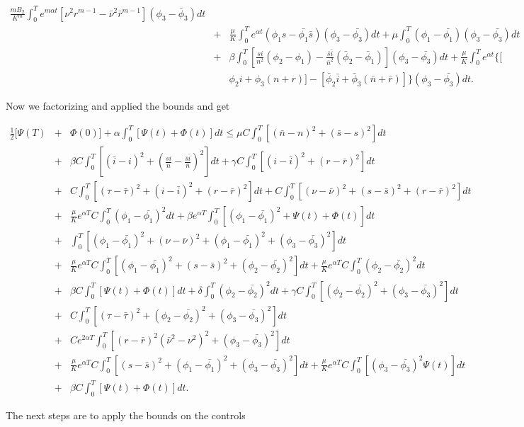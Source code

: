 \begin{eqnarray*}
\frac{m B_2}{K^m}\int_{0}^{T}e^{m\alpha 
t}[\nu^2r^{m-1}-\bar{\nu}^2\bar{r}^{m-1}](\phi_3-\bar{\phi}_3)dt\\
&+&\frac{\mu}{K}\int_{0}^{T}e^{\alpha t}(\phi_1 
s-\bar{\phi_1}\bar{s})(\phi_3-\bar{\phi_3})dt 
+\mu\int_{0}^{T}(\phi_1-\bar{\phi_1})(\phi_3-\bar{\phi_3})dt\nonumber\\
&+&\beta\int_{0}^{T}\left[\frac{s i}{n^2}(\phi_2-\phi_1)-\frac{\bar{s} 
\bar{i}}{\bar{n}^2}(\bar{\phi}_2-\bar{\phi}_1)\right](\phi_3-\bar{\phi_3})dt+\frac{\mu}{K}\int_{0}^{T}e^{\alpha
 t}\{[ \nonumber\\
&&\phi_2 i+\phi_3(n+r)]-[\bar{\phi}_2 
\bar{i}+\bar{\phi}_3(\bar{n}+\bar{r})]\}(\phi_3-\bar{\phi_3})dt. 
\end{eqnarray*}

Now we factorizing and applied the bounds and get

\begin{eqnarray*}
\frac{1}{2}[\Psi(T)&+&\Phi(0)]+\alpha\int_{0}^{T}[\Psi(t)+\Phi(t)]dt\leq \mu 
C\int_{0}^{T}[(\bar{n}-n)^2+(\bar{s}-s)^2]dt\\
&+&\beta 
C\int_{0}^{T}\left[(\bar{i}-i)^2+\left(\frac{si}{n}-\frac{\bar{s}\bar{i}}{\bar{n}}\right)^2\right]dt+\gamma
 C\int_{0}^{T}[(i-\bar{i})^2+(r-\bar{r})^2]dt\\
&+&C\int_{0}^{T}[(\tau-\bar{\tau})^2+(i-\bar{i})^2+(r-\bar{r})^2]dt+C\int_{0}^{T}[(\nu-\bar{\nu})^2+(s-\bar{s})^2+(r-\bar{r})^2]dt\\
&+&\frac{\mu}{K}e^{\alpha T}C\int_{0}^{T}(\phi_1-\bar{\phi_1})^2dt+\beta 
e^{\alpha T}\int_{0}^{T}[(\phi_1-\bar{\phi_1})^2+\Psi(t)+\Phi(t)]dt\\
&+&\int_{0}^{T}[(\phi_1-\bar{\phi_1})^2+(\nu-\bar{\nu})^2+(\phi_1-\bar{\phi_1})^2+(\phi_3-\bar{\phi_3})^2]dt\\
&+&\frac{\mu}{K}e^{\alpha 
T}C\int_{0}^{T}[(\phi_1-\bar{\phi_1})^2+(s-\bar{s})^2+(\phi_2-\bar{\phi_2})^2]dt+\frac{\mu}{K}e^{\alpha
 T}C\int_{0}^{T}(\phi_2-\bar{\phi_2})^2dt\\
&+& \beta 
C\int_{0}^{T}[\Psi(t)+\Phi(t)]dt+\delta\int_{0}^{T}(\phi_2-\bar{\phi_2})^2dt+\gamma
 C\int_{0}^{T}[(\phi_2-\bar{\phi_2})^2+(\phi_3-\bar{\phi_3})^2]dt\\
&+& 
C\int_{0}^{T}[(\tau-\bar{\tau})^2+(\phi_2-\bar{\phi_2})^2+(\phi_3-\bar{\phi_3})^2]dt\\
&+&Ce^{2\alpha 
T}\int_{0}^{T}[(r-\bar{r})^2(\bar{\nu}^2-\nu^2)^2+(\phi_3-\bar{\phi_3})^2]dt\\
&+&\frac{\mu}{K}e^{\alpha 
T}C\int_{0}^{T}[(s-\bar{s})^2+(\phi_1-\bar{\phi_1})^2+(\phi_3-\bar{\phi_3})^2]dt
 + \frac{\mu}{K}e^{\alpha T}C\int_{0}^{T}[(\phi_3-\bar{\phi_3})^2\Psi(t)]dt\\
&+&\beta C\int_{0}^{T}[\Psi (t)+\Phi(t)]dt.
\end{eqnarray*}

The next steps are to apply the bounds on the controls










